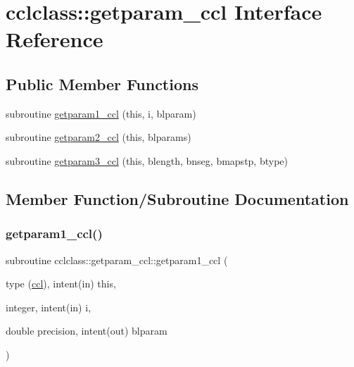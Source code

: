 \hypertarget{interfacecclclass_1_1getparam__ccl}{}\section{cclclass\+::getparam\+\_\+ccl Interface Reference}
\label{interfacecclclass_1_1getparam__ccl}
\subsection*{Public Member Functions}
\begin{DoxyCompactItemize}
\item 
subroutine \mbox{\hyperlink{interfacecclclass_1_1getparam__ccl_a5a2bab17e1624f9138aa987b18055fbc}{getparam1\+\_\+ccl}} (this, i, blparam)
\item 
subroutine \mbox{\hyperlink{interfacecclclass_1_1getparam__ccl_a5cc1f3e82f0e111c1aea9724639eeb24}{getparam2\+\_\+ccl}} (this, blparams)
\item 
subroutine \mbox{\hyperlink{interfacecclclass_1_1getparam__ccl_a71c4ce8f8b3151ae5aca125adccfc70d}{getparam3\+\_\+ccl}} (this, blength, bnseg, bmapstp, btype)
\end{DoxyCompactItemize}


\subsection{Member Function/\+Subroutine Documentation}
\mbox{\label{interfacecclclass_1_1getparam__ccl_a5a2bab17e1624f9138aa987b18055fbc}} 
\subsubsection{\texorpdfstring{getparam1\_ccl()}{getparam1\_ccl()}}
{\footnotesize\ttfamily subroutine cclclass\+::getparam\+\_\+ccl\+::getparam1\+\_\+ccl (\begin{DoxyParamCaption}\item[{type (\mbox{\hyperlink{namespacecclclass_structcclclass_1_1ccl}{ccl}}), intent(in)}]{this,  }\item[{integer, intent(in)}]{i,  }\item[{double precision, intent(out)}]{blparam }\end{DoxyParamCaption})}

